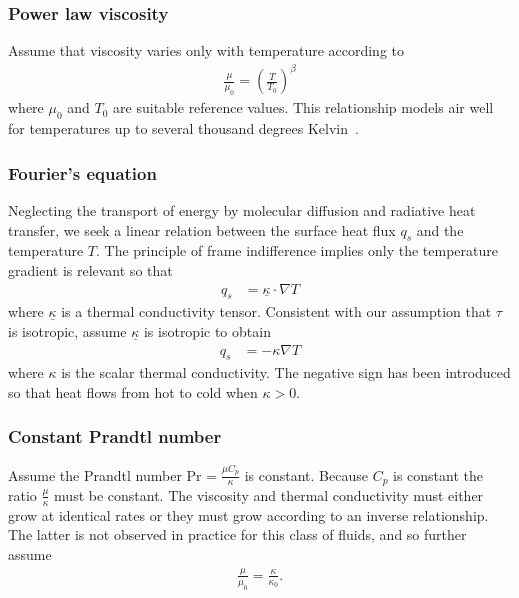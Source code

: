 \documentclass[letterpaper,11pt,nointlimits,reqno,draft]{amsart}
\newcommand{\Prandtl}[1][]{\ensuremath{\mbox{Pr}_{#1}}}
\begin{document}
\subsubsection{Power law viscosity}

Assume that viscosity varies only with temperature according to
\begin{align}
\label{eq:powerlawviscosity}
\frac{\mu}{\mu_{0}}=\left(\frac{T}{T_{0}}\right)^{\beta}
\end{align}
where $\mu_{0}$ and $T_{0}$ are suitable reference values.  This
relationship models air well for temperatures up to several thousand
degrees Kelvin~\citep{NASA-TR-R-132}.

\subsubsection{Fourier's equation}

Neglecting the transport of energy by molecular diffusion and radiative heat
transfer, we seek a linear relation between the surface heat flux $q_{s}$ and
the temperature $T$.  The principle of frame indifference implies only the
temperature gradient is relevant so that
\begin{align}
  \label{eq:fouriertensorlaw}
  q_{s} &= \underline{\kappa} \cdot \nabla{} T
\end{align}
where $\underline{\kappa}$ is a thermal conductivity tensor.
Consistent with our assumption that $\tau$ is isotropic, assume
$\underline{\kappa}$ is isotropic to obtain
\begin{align}
  \label{eq:fourierlaw}
  q_{s} &= - \kappa \nabla{} T
\end{align}
where $\kappa$ is the scalar thermal conductivity.  The negative sign has been
introduced so that heat flows from hot to cold when $\kappa>0$.

\subsubsection{Constant Prandtl number}

Assume the Prandtl number $\Prandtl = \frac{\mu{}C_{p}}{\kappa}$ is constant.
Because $C_{p}$ is constant the ratio $\frac{\mu}{\kappa}$ must be
constant.  The viscosity and thermal conductivity must either grow at
identical rates or they must grow according to an inverse relationship.
The latter is not observed in practice for this class of fluids, and
so further assume
\begin{align}
  \frac{\mu}{\mu_{0}} = \frac{\kappa}{\kappa_{0}}
  .
  \label{eq:mukappa}
\end{align}
\end{document}
